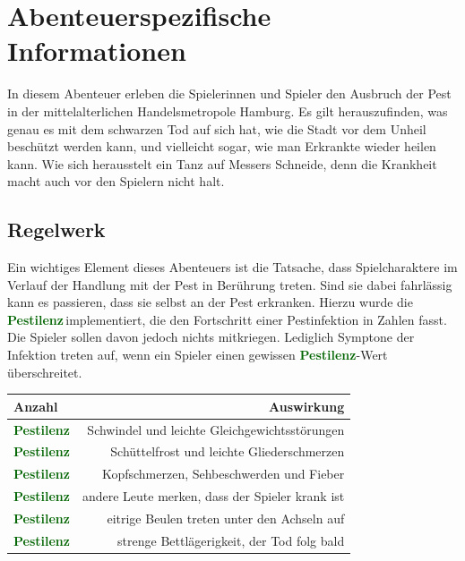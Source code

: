 
\section*{Abenteuerspezifische Informationen}

In diesem Abenteuer erleben die Spielerinnen und Spieler den Ausbruch der Pest in der
mittelalterlichen Handelsmetropole Hamburg. Es gilt herauszufinden, was genau es mit
dem schwarzen Tod auf sich hat, wie die Stadt vor dem Unheil beschützt werden kann,
und vielleicht sogar, wie man Erkrankte wieder heilen kann. Wie sich herausstelt ein
Tanz auf Messers Schneide, denn die Krankheit macht auch vor den Spielern nicht halt.

\subsection*{Regelwerk}
\label{ssec:rules}

\newcommand{\Pestilenz}[1][]{\textbf{\textcolor{darkgreen}{Pestilenz\ifthenelse{\equal{#1}{}}{}{$\;#1$}}}}

Ein wichtiges Element dieses Abenteuers ist die Tatsache, dass Spielcharaktere im
Verlauf der Handlung mit der Pest in Berührung treten. Sind sie dabei fahrlässig
kann es passieren, dass sie selbst an der Pest erkranken. Hierzu wurde die 
\Pestilenz{}$\,$implementiert, die den Fortschritt einer Pestinfektion in Zahlen 
fasst. Die Spieler sollen davon jedoch nichts mitkriegen. Lediglich Symptone der 
Infektion treten auf, wenn ein Spieler einen gewissen \Pestilenz{}-Wert 
überschreitet.

\begin{center}
\begingroup
\renewcommand{\arraystretch}{1.4}
  \begin{tabular*}{0.8\textwidth}{@{\extracolsep{\fill}} lr}
    \toprule
    Anzahl & Auswirkung \\
    \midrule
    \Pestilenz[1-2] & Schwindel und leichte Gleichgewichtsstörungen \\
    \Pestilenz[3-4] & Schüttelfrost und leichte Gliederschmerzen \\
    \Pestilenz[5-6] & Kopfschmerzen, Sehbeschwerden und Fieber \\
    \Pestilenz[7-8] & andere Leute merken, dass der Spieler krank ist \\
    \Pestilenz[9-10] & eitrige Beulen treten unter den Achseln auf \\
    \Pestilenz[>10] & strenge Bettlägerigkeit, der Tod folg bald \\
    \bottomrule
  \end{tabular*}
\endgroup
\end{center}

